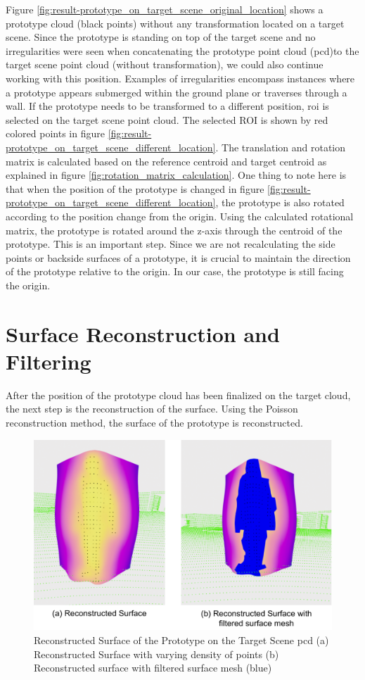 Figure \ref{fig:result-prototype_on_target_scene_original_location} shows a prototype cloud (black points) without any transformation located on a target scene. Since the prototype is standing on top of the target scene and no irregularities were seen when concatenating the prototype point cloud (\acrshort{pcd})to the target scene point cloud (without transformation), we could also continue working with this position. Examples of irregularities encompass instances where a prototype appears submerged within the ground plane or traverses through a wall. If the prototype needs to be transformed to a different position, \acrfull{roi} is selected on the target scene point cloud. The selected ROI is shown by red colored points in figure \ref{fig:result-prototype_on_target_scene_different_location}. The translation and rotation matrix is calculated based on the reference centroid and target centroid as explained in figure \ref{fig:rotation_matrix_calculation}. One thing to note here is that when the position of the prototype is changed in figure \ref{fig:result-prototype_on_target_scene_different_location}, the prototype is also rotated according to the position change from the origin. Using the calculated rotational matrix, the prototype is rotated around the z-axis through the centroid of the prototype. This is an important step. Since we are not recalculating the side points or backside surfaces of a prototype, it is crucial to maintain the direction of the prototype relative to the origin. In our case, the prototype is still facing the origin.

\section{Surface Reconstruction and Filtering}
After the position of the prototype cloud has been finalized on the target cloud, the next step is the reconstruction of the surface. Using the Poisson reconstruction method, the surface of the prototype is reconstructed.

\begin{figure}[htbp]
    \centering
    \includegraphics[width=1\linewidth]{97_graphics/results/surface_reconstruction.pdf}
    \caption{Reconstructed Surface of the Prototype on the Target Scene \acrshort{pcd} (a) Reconstructed Surface with varying density of points (b) Reconstructed surface with filtered surface mesh (blue)}
    \label{fig:result-surface_reconstruction}
\end{figure}

